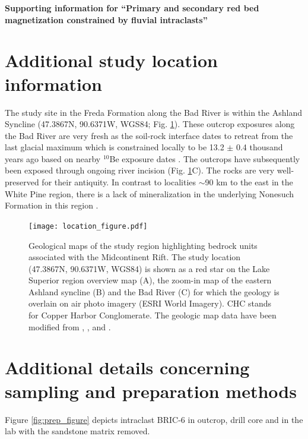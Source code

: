 \documentclass[11pt,letterpaper]{article}
\begin{document}
\begin{flushleft}
{\Large \textbf{Supporting information for ``Primary and secondary red bed magnetization constrained by fluvial intraclasts''}}

\end{flushleft}

\section*{Additional study location information}
The study site in the Freda Formation along the Bad River is within the Ashland Syncline (47.3867\textdegree N, 90.6371\textdegree W, WGS84; Fig. \ref{fig:location_figure}). These outcrop exposures along the Bad River are very fresh as the soil-rock interface dates to retreat from the last glacial maximum which is constrained locally to be 13.2 $\pm$ 0.4 thousand years ago based on nearby $^{10}$Be exposure dates \citep{Ullman2015a}. The outcrops have subsequently been exposed through ongoing river incision (Fig. \ref{fig:location_figure}C). The rocks are very well-preserved for their antiquity. In contrast to localities $\sim$90 km to the east in the White Pine region, there is a lack of mineralization in the underlying Nonesuch Formation in this region \citep{Stewart2017a}. 

\begin{figure}[!ht]
\noindent\texttt{[image: location\_figure.pdf]}
\caption{\small{Geological maps of the study region highlighting bedrock units associated with the Midcontinent Rift. The study location (47.3867\textdegree N, 90.6371\textdegree W, WGS84) is shown as a red star on the Lake Superior region overview map (A), the zoom-in map of the eastern Ashland syncline (B) and the Bad River (C) for which the geology is overlain on air photo imagery (ESRI World Imagery). CHC stands for Copper Harbor Conglomerate. The geologic map data have been modified from \cite{Survey2011a}, \cite{Nicholson2004a}, and \cite{Jirsa2011a}.}}
\label{fig:location_figure}
\end{figure} 

\section*{Additional details concerning sampling and preparation methods}

Figure \ref{fig:prep_figure} depicts intraclast BRIC-6 in outcrop, drill core and in the lab with the sandstone matrix removed.
\end{document}
